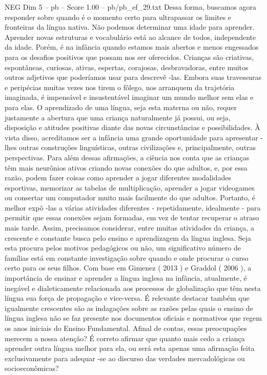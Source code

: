 \begin{textsample}{NEG Dim 5 – pb – Score 1.00 – pb/pb\_ef\_29.txt}
Dessa forma, buscamos agora responder sobre quando é o momento certo para ultrapassar os limites e fronteiras da língua nativa.
Não podemos determinar uma idade para aprender.
Aprender novas estruturas e vocabulário está ao alcance de todos, independente da idade.
Porém, é na infância quando estamos mais abertos e menos engessados para os desafios positivos que possam nos ser oferecidos.
Crianças são criativas, espontâneas, curiosas, ativas, espertas, corajosas, desbravadoras, entre muitos outros adjetivos que poderíamos usar para descrevê -las.
Embora suas travessuras e peripécias muitas vezes nos tirem o fôlego, nos arranquem da trajetória imaginada, é impensável e insustentável imaginar um mundo melhor sem elas e para elas.
O aprendizado de uma língua, seja esta materna ou não, requer justamente a abertura que uma criança naturalmente já possui, ou seja, disposição e atitudes positivas diante das novas circunstâncias e possibilidades.
À vista disso, acreditamos ser a infância uma grande oportunidade para apresentar -lhes outras construções linguísticas, outras civilizações e, principalmente, outras perspectivas.
Para além dessas afirmações, a ciência nos conta que as crianças têm mais neurônios ativos criando novas conexões do que adultos, e, por essa razão, podem fazer coisas como aprender a jogar diferentes modalidades esportivas, memorizar as tabelas de multiplicação, aprender a jogar videogames ou consertar um computador muito mais facilmente do que adultos.
Portanto, é melhor expô -las a várias atividades diferentes - repetidamente, idealmente - para permitir que essas conexões sejam formadas, em vez de tentar recuperar o atraso mais tarde.
Assim, precisamos considerar, entre muitas atividades da criança, a crescente e constante busca pelo ensino e aprendizagem da língua inglesa.
Seja esta procura pelos motivos pedagógicos ou não, um significativo número de famílias está em constante investigação sobre quando e onde procurar o curso certo para os seus filhos.
Com base em Gimenez ( 2013 ) e Graddol ( 2006 ), a importância de ensinar e aprender a língua inglesa na infância, atualmente, é inegável e dialeticamente relacionada aos processos de globalização que têm nesta língua sua força de propagação e vice-versa.
É relevante destacar também que igualmente crescentes são as indagações sobre as razões pelas quais o ensino de língua inglesa não se faz presente nos documentos oficiais e normativos que regem os anos iniciais do Ensino Fundamental.
Afinal de contas, essas preocupações merecem a nossa atenção?
É correto afirmar que quanto mais cedo a criança aprender outra língua melhor para ela, ou será esta apenas uma afirmação feita exclusivamente para adequar -se ao discurso das verdades mercadológicas ou socioeconômicas?

\end{textsample}
